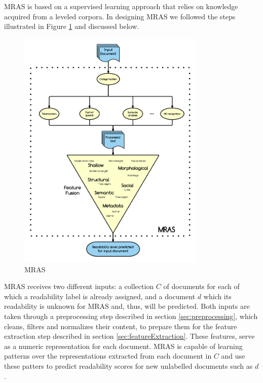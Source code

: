 \documentclass{bsu-ms}
\newcommand{\projectName}{MRAS\xspace}
\begin{document}
\projectName is based on a supervised learning approach that relies on knowledge acquired from a leveled corpora. In designing \projectName we followed the steps illustrated in Figure \ref{fig:pipeline} and discussed below.



\begin{figure}[h!]
\centering
\includegraphics[width=0.8\textwidth]{pipelineGraph}
\caption{\projectName}
\label{fig:pipeline}
\end{figure}



\projectName receives two different inputs: a collection $C$ of documents for each of which a readability label is already assigned, and a document $d$ which its readability is unknown for \projectName and, thus, will be predicted. Both inputs are taken through a preprocessing step described in section \ref{sec:preprocessing}, which cleans, filters and normalizes their content, to prepare them for the feature extraction step described in section \ref{sec:featureExtraction}. These features, serve as a numeric representation for each document. \projectName is capable of learning patterns over the representations extracted from each document in $C$ and use these patters to predict readability scores for new unlabelled documents such as $d$.
\end{document}
